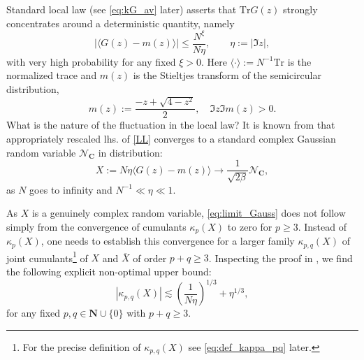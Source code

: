 \documentclass[10pt]{amsart}
\numberwithin{equation}{section}
\newcommand{\C}{\mathbf{C}}
\newcommand{\N}{\mathbf{N}}
\newcommand{\Tr}{\mathrm{Tr}}
\begin{document}
Standard local law (see \eqref{eq:kG_av}  later) asserts that $\Tr G(z) $ strongly concentrates around a deterministic quantity, namely
\begin{equation}\label{LL}
       |\langle G(z)-m(z)\rangle| \le \frac{N^\xi}{N\eta},\qquad \eta:=|\Im z|,
\end{equation}
with very high probability for any fixed $\xi>0$. Here $\langle\cdot\rangle:=N^{-1}\Tr$ is the normalized trace and $m(z)$ is the Stieltjes transform of the semicircular distribution,
\begin{equation}
m(z):=\frac{-z+\sqrt{4-z^2}}{2},\quad \Im z\Im m(z)>0.
\label{eq:def_m}
\end{equation}
What is the nature of the fluctuation in the local law? It is known from \cite[Theorem 2.2, Remark 2.4]{HeKnowles} that appropriately rescaled lhs. of \eqref{LL} converges to a standard complex Gaussian random variable $\mathcal{N}_\C$ in distribution:
\begin{equation}
X:=N\eta \langle G(z)-m(z)\rangle \to \frac{1}{\sqrt{2\beta}}\mathcal{N}_\C,
\label{eq:limit_Gauss}
\end{equation}
as $N$ goes to infinity and $N^{-1}\ll\eta \ll 1$. 

As $X$ is a genuinely complex random variable, \eqref{eq:limit_Gauss} does not follow simply from the convergence of cumulants $\kappa_p(X)$ to zero for $p\ge 3$. Instead of $\kappa_p(X)$, one needs to establish this convergence for a larger family $\kappa_{p,q}(X)$ of joint cumulants\footnote{For the precise definition of $\kappa_{p,q}(X)$ see \eqref{eq:def_kappa_pq} later.} of $X$ and $\overline{X}$ of order $p+q\ge 3$. Inspecting the proof in \cite{HeKnowles}, we find the following explicit non-optimal upper bound:  
\begin{equation}
\left\vert\kappa_{p,q}\left(X\right)\right\vert\lesssim \left(\frac{1}{N\eta}\right)^{1/3}+\eta^{1/3},
\label{eq:limit_Gauss_kappa}
\end{equation}
for any fixed $p,q\in\N\cup\{0\}$ with $p+q\ge 3$.
\end{document}
